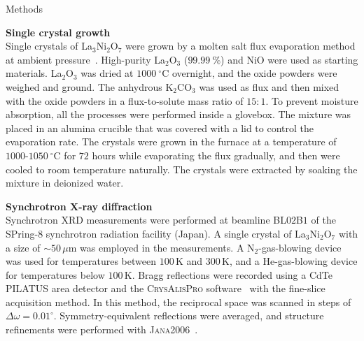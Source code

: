 \documentclass[aps,12pt,floatfix,longbibliography,a4paper]{revtex4-2}
\newcommand{\LNO}{La$_3$Ni$_2$O$_7$}
\begin{document}
\begin{center}
\Large{Methods}
\end{center}

\textbf{Single crystal growth}\\
Single crystals of \LNO{} were grown by a molten salt flux evaporation method at ambient pressure~\cite{Li2026-go}. High-purity La$_2$O$_3$ ($99.99~\%$) and NiO were used as starting materials. La$_2$O$_3$ was dried at $1000~^\circ$C overnight, and the oxide powders were weighed and ground. The anhydrous K$_2$CO$_3$ was used as flux and then mixed with the oxide powders in a flux-to-solute mass ratio of $15:1$. To prevent moisture absorption, all the processes were performed inside a glovebox. The mixture was placed in an alumina crucible that was covered with a lid to control the evaporation rate. The crystals were grown in the furnace at a temperature of $1000\text{-}1050~^\circ$C for $72$ hours while evaporating the flux gradually, and then were cooled to room temperature naturally. The crystals were extracted by soaking the mixture in deionized water. 
\bigskip

\textbf{Synchrotron X-ray diffraction}\\
Synchrotron XRD measurements were performed at beamline BL$02$B$1$ of the SPring-$8$ synchrotron radiation facility (Japan). A single crystal of \LNO{} with a size of $\sim 50\,\mu$m was employed in the measurements. A N$_2$-gas-blowing device was used for temperatures between $100\,$K and $300\,$K, and a He-gas-blowing device for temperatures below $100\,$K. Bragg reflections were recorded using a CdTe PILATUS area detector and the \textsc{CrysAlisPro} software~\cite{Agilent-Technologies-Ltd2014-hl} with the fine-slice acquisition method. In this method, the reciprocal space was scanned in steps of $\Delta \omega = 0.01^\circ$. Symmetry-equivalent reflections were averaged, and structure refinements were performed with \textsc{Jana2006}~\cite{Petricek2014-pc}.
\bigskip
\end{document}
